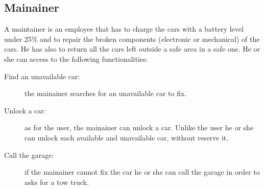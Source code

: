 \subsection{Mainainer}
A maintainer is an employee that has to charge the cars with a battery level under 25\% and to repair the broken components (electronic or mechanical) of the cars. He has also to return all the cars left outside a safe area in a safe one. He or she can access to the following functionalities:
\begin{description}
\item[Find an unavailable car:] the mainainer searches for an unavailable car to fix.
\item[Unlock a car:] as for the user, the mainainer can unlock a car. Unlike the user he or she can unlock each available and unavailable car, without reserve it.
\item[Call the garage:] if the mainainer cannot fix the car he or she can call the garage in order to asks for a tow truck.
\end{description}

